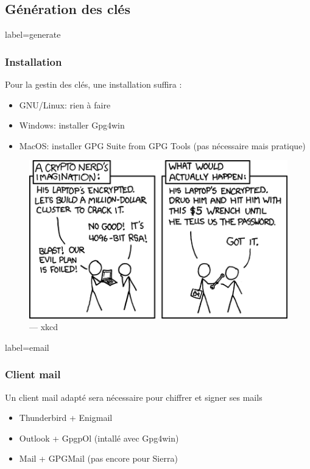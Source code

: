 \documentclass{beamer}
\begin{document}
    \subsection{Génération des clés}
        \begin{frame}{label=generate}
            \frametitle{Installation}
            Pour la gestin des clés, une installation suffira \cite{best}:
            \begin{center}
                \begin{itemize}
                    \item GNU/Linux: rien à faire
                    \item Windows: installer Gpg4win
                    \item MacOS: installer GPG Suite from GPG Tools (pas nécessaire mais pratique)
                \end{itemize}
            \end{center}
        \end{frame}
        \begin{frame}
            \begin{center}
                \begin{figure}
                    \includegraphics[scale=0.60]{img/security.png}
                    \caption{\cc --- xkcd}
                \end{figure}
            \end{center}
        \end{frame}
        \begin{frame}{label=email}
            \frametitle{Client mail}
            Un client mail adapté sera nécessaire pour chiffrer et signer ses mails
            \begin{center}
                \begin{itemize}
                    \item Thunderbird + Enigmail
                    \item Outlook + GpgpOl (intallé avec Gpg4win)
                    \item Mail + GPGMail (pas encore pour Sierra)
                \end{itemize}
            \end{center}
        \end{frame}
        \appendix
        \begin{frame}
            {}
            
        \end{frame}
\end{document}
